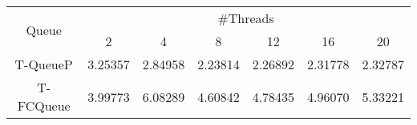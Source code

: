 \begin{tabular}{|c|c|c|c|c|c|c|}
\hline
\multirow{2}{*}{Queue} & \multicolumn{6}{c|}{\#Threads}\\\cline{2-7}& 2 & 4 & 8 & 12 & 16 & 20\\
\hline
\hline
T-QueueP & 3.25357 & 2.84958 & 2.23814 & 2.26892 & 2.31778 & 2.32787\\
T-FCQueue & 3.99773 & 6.08289 & 4.60842 & 4.78435 & 4.96070 & 5.33221\\
\hline\end{tabular}

